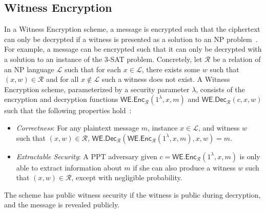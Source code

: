 \subsection{Witness Encryption}
    In a Witness Encryption scheme, a message is encrypted such that the ciphertext can only be decrypted if a witness is presented as a solution to an NP problem~\cite{witness_encryption}.
    For example, a message can be encrypted such that it can only be decrypted with a solution to an instance of the 3-SAT problem.
    Concretely, let $\mathcal{R}$ be a relation of an NP language $\mathcal{L}$ such that for each $x \in \mathcal{L}$, there exists some $w$ such that $(x, w) \in \mathcal{R}$ and for all $x \notin \mathcal{L}$ such a witness does not exist.
    A Witness Encryption scheme, parameterized by a security parameter $\lambda$, consists of the encryption and decryption functions $\textsf{WE.Enc}_\mathcal{R}(1^{\lambda}, x, m)$ and $\textsf{WE.Dec}_\mathcal{R}(c, x, w)$ such that the following properties hold~\cite{timelock_from_crc}:
    \begin{itemize}
        \item \emph{Correctness}: For any plaintext message $m$, instance $x \in \mathcal{L}$, and witness $w$ such that $(x, w) \in \mathcal{R}$, $\textsf{WE.Dec}_\mathcal{R}(\textsf{WE.Enc}_\mathcal{R}(1^{\lambda}, x, m), x, w) = m$.
        \item \emph{Extractable Security}: A PPT adversary given $c = \textsf{WE.Enc}_\mathcal{R}(1^{\lambda}, x, m)$ is only able to extract information about $m$ if she can also produce a witness $w$ such that $(x, w) \in \mathcal{R}$, except with negligible probability.
    \end{itemize}
    The scheme has public witness security if the witness is public during decryption, and the message is revealed publicly.

